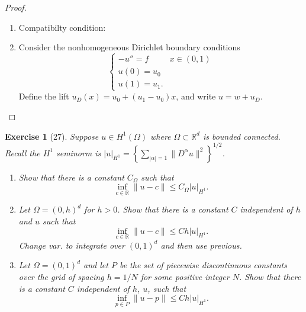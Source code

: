 \documentclass[letterpaper,twoside,11pt]{article}
\theoremstyle{mystyle}
\newtheorem*{exercise}{Exercise}
\newcommand{\R}{{\mathbb R}}
\newcommand{\cbk}{\color{black}}
\newcommand{\cblu}{\color{blue}}
\begin{document}
\cblu
\begin{proof}
  \begin{enumerate}
    \item  Compatibilty condition: 
    \item Consider the nonhomogeneous Dirichlet boundary conditions
    \[\left\{ {\begin{array}{*{20}{l}}
      -u''=f & x \in (0,1)\\[.2cm]
      u(0) = u_0\\[.2cm]
      u(1) = u_1.
    \end{array}} \right.\]
    Define the lift $u_D(x) = u_0 + (u_1-u_0)x$, and write \(u = w + u_D\).
  \end{enumerate}
\end{proof}
\cbk 







\newpage 
\begin{exercise}[27]
  Suppose $u \in H^1\left( \Omega \right)$ where $\Omega\subset \R^d$ is bounded connected. Recall the $H^1$ seminorm is $|u|_{H^1} = \left\{ \sum_{|\alpha| = 1} \|D^\alpha u \|^2 \right\}^{1/2}$. 
  \begin{enumerate}
    \item Show that there is a constant $C_\Omega$ such that 
    \[\inf_{c\in \R} \|u-c\| \leq C_\Omega |u|_{H^1}.\]
    \item Let $\Omega = \left( 0, h \right)^d$ for $h > 0$. Show that there is a constant $C$ independent of $h$ and $u$ such that 
    \[\inf_{c\in \R} \|u-c\| \leq Ch |u|_{H^1}.\]
    Change var. to integrate over $(0,1)^d$ and then use previous. 
    \item Let $\Omega = \left( 0,1 \right)^d$ and let $P$ be the set of piecewise discontinuous constants over the grid of spacing $h = 1/N$ for some positive integer $N$. Show that there is a constant $C$ independent of $h$, $u$, such that 
    \[\inf_{p\in P} \|u-p\| \leq Ch |u|_{H^1}.\]
  \end{enumerate}
\end{exercise}
\end{document}
